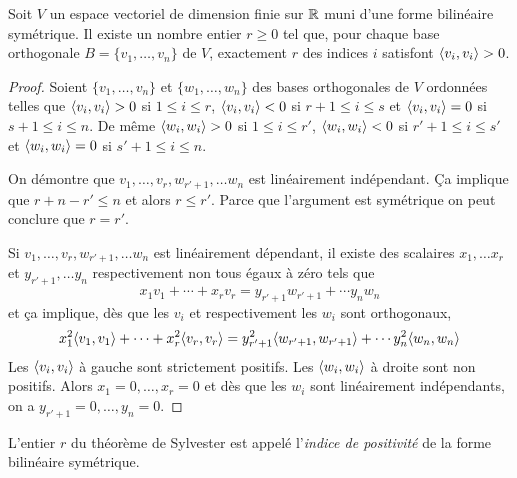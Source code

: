 \begin{theorem} 
\label{thr:10}
Soit $V$
un espace vectoriel de dimension finie sur $\mathbb{R}$
muni d'une forme bilinéaire symétrique.
Il existe un nombre entier $r ≥0$ tel que, pour chaque base orthogonale 
  $B = \{v_1,\dots,v_n\}$ de $V$, 
 exactement $r$ des indices $i$ satisfont $\langle {v_i,v_i} \rangle>0$.
\end{theorem}


\begin{proof}
  Soient $\{v_1,\dots,v_n\}$
  et $\{w_1,\dots,w_n\}$ des
  bases orthogonales de $V$ ordonnées 
  telles que $\langle {v_i,v_i} \rangle >0 $
  si $1 \leq i \leq r$,
  $\langle {v_i,v_i} \rangle <0 $
  si $r+1 \leq i \leq s$
  et $\langle {v_i,v_i} \rangle =0 $
  si $s+1 \leq i \leq n$.
  De même $\langle {w_i,w_i} \rangle >0 $
  si $1 \leq i \leq r'$,
  $\langle {w_i,w_i} \rangle <0 $
  si $r'+1 \leq i \leq s'$
  et $\langle {w_i,w_i} \rangle =0 $ si $s'+1 \leq i \leq n$.



  On démontre que $v_1,\dots,v_r,w_{r'+1},\dots w_n$
  est linéairement indépendant. Ça implique que $r + n-r' \leq n$
  et alors $r \leq r'$.
  Parce que l'argument est symétrique on peut conclure que $r = r'$.

  Si $v_1,\dots,v_r,w_{r'+1},\dots w_n$ est linéairement dépendant, il existe des scalaires $x_1,\dots x_r$ et $y_{r'+1},\dots y_n$ respectivement  non tous égaux à zéro tels que 
  \begin{displaymath}
    x_1 v_1 + \cdots + x_r v_r = y_{r'+1} w_{r'+1} + \cdots y_n w_n 
  \end{displaymath}
et ça implique, dès que les $v_i$ et respectivement les $w_i$  sont orthogonaux, 
\begin{displaymath}
   x_1^2\langle {v_1,v_1} \rangle + \cdots + x_r^2 \langle {v_r,v_r} \rangle = y_{r'+1}^2 \langle {w_{r'+1},w_{r'+1}} \rangle + \cdots y_n^2 \langle {w_n,w_n} \rangle 
\end{displaymath}
Les $\langle {v_i,v_i} \rangle$ à gauche sont strictement positifs. Les $\langle {w_i,w_i} \rangle $ à droite sont non positifs. Alors $x_1=0,\dots,x_r = 0$ et dès que les $w_i$ sont linéairement indépendants, on a $y_{r'+1}=0,\dots,y_n=0$. 
\end{proof}


\begin{definition}
  \label{def:12}
  L'entier $r$ du théorème de Sylvester est appelé l'\emph{indice de positivité} de la forme bilinéaire symétrique. 
\end{definition}



